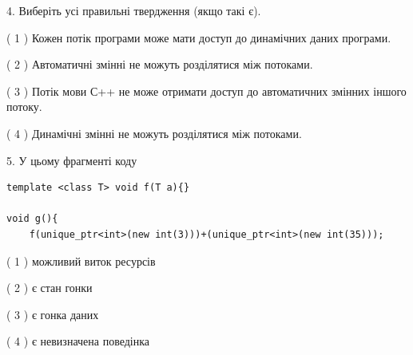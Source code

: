 \documentclass[12pt, ukrainian]{article}
\begin{document}
\begin {large}
{%
4. Виберіть усі правильні твердження (якщо такі є).\par
\vspace{2mm}

( 1 ) Кожен потік програми може мати доступ до динамічних даних програми.%

( 2 ) Автоматичні змінні не можуть розділятися між потоками.%

( 3 ) Потік мови С++ не може отримати доступ до автоматичних змінних іншого потоку.%

( 4 ) Динамічні змінні не можуть розділятися між потоками.%


5. У цьому фрагменті коду
\begin{verbatim}
template <class T> void f(T a){}

void g(){
    f(unique_ptr<int>(new int(3)))+(unique_ptr<int>(new int(35)));
\end{verbatim}

( 1 ) можливий виток ресурсів%

( 2 ) є стан гонки%

( 3 ) є гонка даних%

( 4 ) є невизначена поведінка%
}
\end {large}
\end{document}
